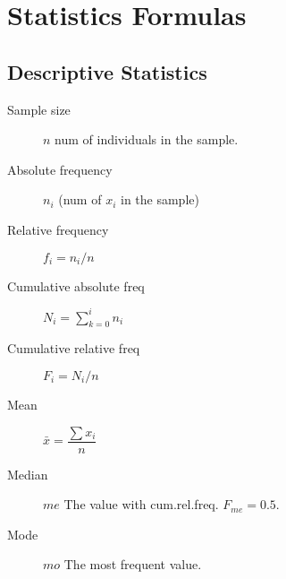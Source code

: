 
\sloppy

\section*{Statistics Formulas}

\footnotesize
{}

\begin{multicols*}{2}

\subsection*{Descriptive Statistics}

\begin{tcolorbox}[hbox, title=Frequencies]
\begin{minipage}{0.4\textwidth}
\begin{description}
\item [Sample size] $n$ num of individuals in the sample.
\end{description}
\begin{description}
\item [Absolute frequency] $n_i$ (num of $x_i$ in the sample)
\item [Relative frequency] $f_i=n_i/n$
\item [Cumulative absolute freq] $N_i=\sum_{k=0}^in_i$
\item [Cumulative relative freq] $F_i=N_i/n$
\end{description}
\end{minipage}
\end{tcolorbox}

\begin{tcolorbox}[hbox, title=Central tendency statistics]
\begin{minipage}{0.4\textwidth}
\begin{description}
\item [Mean] $\bar{x}=\dfrac{\sum x_i}{n}$
\item [Median] $me$ The value with cum.rel.freq. $F_{me}=0.5$.
\item [Mode] $mo$ The most frequent value.
\end{description}
\end{minipage}
\end{tcolorbox}


\end{multicols*}
